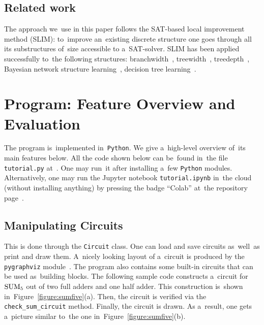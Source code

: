 \subsection{Related work}
The approach we~use in this paper follows the SAT-based
local improvement method (SLIM): to~improve an~existing
discrete structure one goes through all its substructures
of~size accessible to a~SAT-solver.
SLIM has been applied successfully to~the following
structures:
branchwidth~\cite{DBLP:journals/tocl/LodhaOS19},
treewidth~\cite{DBLP:conf/sat/FichteLS17},
treedepth~\cite{DBLP:conf/cp/RamaswamyS20},
Bayesian network structure learning~\cite{DBLP:conf/aaai/RamaswamyS21},
decision tree learning~\cite{DBLP:conf/aaai/SchidlerS21}.

\section{Program: Feature Overview and Evaluation}
The program is~implemented in~\texttt{Python}.
We give a~high-level overview of~its main features below.
All the code shown below
can be~found in~the
file \texttt{tutorial.py} at~\cite{git-improvement}.
One may run~it after installing a~few \texttt{Python} modules. Alternatively, one may run the Jupyter notebook
\texttt{tutorial.ipynb} in~the cloud (without installing
anything) by pressing the badge ``Colab''
at~the repository page~\cite{git-improvement}.

\subsection{Manipulating Circuits}
This is done through the \texttt{Circuit}
class. One can load and save circuits as~well~as
print and draw them. A~nicely looking layout of
a~circuit is produced by the \texttt{pygraphviz} module~\cite{pygraphviz}. The program also contains some built-in
circuits that can be used as~building blocks.
The following sample code constructs a~circuit
for $\operatorname{SUM}_5$ out of two full adders and
one half adder. This construction is~shown
in~Figure~\ref{figure:sumfive}(a). Then,
the circuit is verified via the
\texttt{check_sum_circuit} method.
Finally, the circuit is drawn. As a~result, one gets
a~picture similar to~the one in~Figure~\ref{figure:sumfive}(b).

\inputminted[firstline=40,lastline=47]{python}{../tutorial.py}

